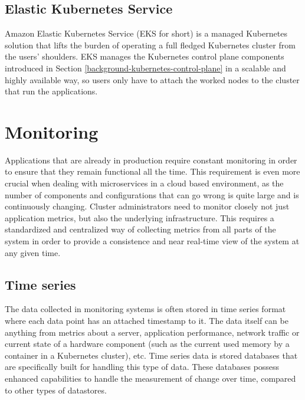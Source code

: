 \subsection{Elastic Kubernetes Service}

Amazon Elastic Kubernetes Service (EKS for short) is a managed Kubernetes solution that lifts the burden of operating a full fledged Kubernetes cluster from the users' shoulders. EKS manages the Kubernetes control plane components introduced in Section \ref{background-kubernetes-control-plane} in a scalable and highly available way, so users only have to attach the worked nodes to the cluster that run the applications. \cite{AWSEKS}

\section{Monitoring}

Applications that are already in production require constant monitoring in order to ensure that they remain functional all the time. This requirement is even more crucial when dealing with microservices in a cloud based environment, as the number of components and configurations that can go wrong is quite large and is continuously changing. Cluster administrators need to monitor closely not just application metrics, but also the underlying infrastructure. This requires a standardized and centralized way of collecting metrics from all parts of the system in order to provide a consistence and near real-time view of the system at any given time.

\subsection{Time series}

The data collected in monitoring systems is often stored in time series format where each data point has an attached timestamp to it. The data itself can be anything from metrics about a server, application performance, network traffic or current state of a hardware component (such as the current used memory by a container in a Kubernetes cluster), etc. Time series data is stored databases that are specifically built for handling this type of data. These databases possess enhanced capabilities to handle the measurement of change over time, compared to other types of datastores. \cite{TimeSeriesInflux}


